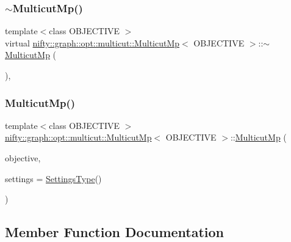 \subsubsection{\texorpdfstring{$\sim$\+Multicut\+Mp()}{~MulticutMp()}}
{\footnotesize\ttfamily template$<$class O\+B\+J\+E\+C\+T\+I\+VE $>$ \\
virtual \hyperlink{classnifty_1_1graph_1_1opt_1_1multicut_1_1MulticutMp}{nifty\+::graph\+::opt\+::multicut\+::\+Multicut\+Mp}$<$ O\+B\+J\+E\+C\+T\+I\+VE $>$\+::$\sim$\hyperlink{classnifty_1_1graph_1_1opt_1_1multicut_1_1MulticutMp}{Multicut\+Mp} (\begin{DoxyParamCaption}{ }\end{DoxyParamCaption})\hspace{0.3cm}{\ttfamily [inline]}, {\ttfamily [virtual]}}

\mbox{\label{classnifty_1_1graph_1_1opt_1_1multicut_1_1MulticutMp_a90465e1daa1cabe6cf0cb5fe97872d87}} 
\subsubsection{\texorpdfstring{Multicut\+Mp()}{MulticutMp()}}
{\footnotesize\ttfamily template$<$class O\+B\+J\+E\+C\+T\+I\+VE $>$ \\
\hyperlink{classnifty_1_1graph_1_1opt_1_1multicut_1_1MulticutMp}{nifty\+::graph\+::opt\+::multicut\+::\+Multicut\+Mp}$<$ O\+B\+J\+E\+C\+T\+I\+VE $>$\+::\hyperlink{classnifty_1_1graph_1_1opt_1_1multicut_1_1MulticutMp}{Multicut\+Mp} (\begin{DoxyParamCaption}\item[{const \hyperlink{classnifty_1_1graph_1_1opt_1_1multicut_1_1MulticutMp_a9fefe9d9756a1eef71329656d2fdf9f4}{Objective\+Type} \&}]{objective,  }\item[{const \hyperlink{structnifty_1_1graph_1_1opt_1_1multicut_1_1MulticutMp_1_1SettingsType}{Settings\+Type} \&}]{settings = {\ttfamily \hyperlink{structnifty_1_1graph_1_1opt_1_1multicut_1_1MulticutMp_1_1SettingsType}{Settings\+Type}()} }\end{DoxyParamCaption})}



\subsection{Member Function Documentation}
\mbox{\label{classnifty_1_1graph_1_1opt_1_1multicut_1_1MulticutMp_a9b359aa0b88830fa4d44a4d115a06042}} 

